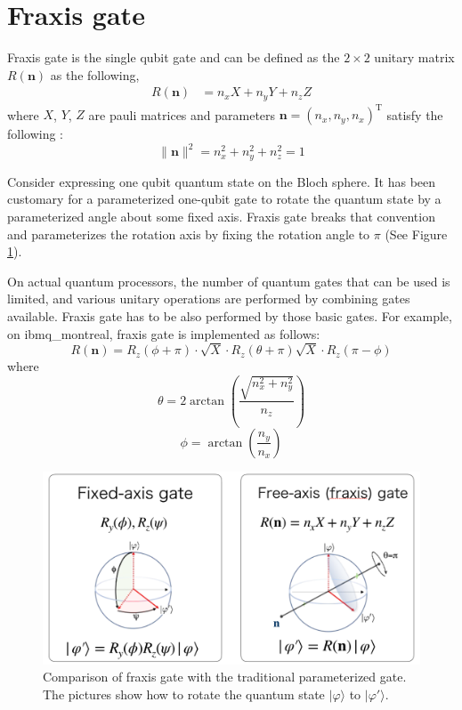 \section{Fraxis gate}
\par Fraxis gate is the single qubit gate and can be defined as the $2\times 2$ unitary matrix $R(\bm{n})$ as the following,
$$\begin{aligned}
R(\bm{n})&=n_xX+n_yY+n_zZ
\end{aligned}$$
where $X$, $Y$, $Z$ are pauli matrices and parameters $\bm{n}=(n_x,n_y,n_x)^{ \mathrm{T} }$ satisfy the following :
$$\|\bm{n}\|^2=n_x^2+n_y^2+n_z^2=1
$$

\par Consider expressing one qubit quantum state on the Bloch sphere. It has been customary for a parameterized one-qubit gate to rotate the quantum state by a parameterized angle about some fixed axis. Fraxis gate breaks that convention and parameterizes the rotation axis by fixing the rotation angle to $\pi$ (See Figure \ref{fig:gate}).

On actual quantum processors, the number of quantum gates that can be used is limited, and various unitary operations are performed by combining gates available. Fraxis gate has to be also performed by those basic gates. For example, on ibmq\_montreal, fraxis gate is implemented as follows:
$$R(\bm{n})=R_z(\phi+\pi)\cdot\sqrt{X}\cdot R_z(\theta+\pi)\sqrt{X}\cdot R_z(\pi-\phi)$$
where
$$\theta=2\arctan\left(\frac{\sqrt{n_x^2+n_y^2}}{n_z}\right)$$
$$\phi=\arctan\left(\frac{n_y}{n_x}\right)$$

\begin{figure}[H]
    \centering
    \includegraphics[keepaspectratio, scale=0.5]{preliminary/gate.png}
    \caption{Comparison of fraxis gate with the traditional parameterized gate. The pictures show how to rotate the quantum state $|\varphi\rangle$ to $|\varphi'\rangle$.}
    \label{fig:gate}
\end{figure}
